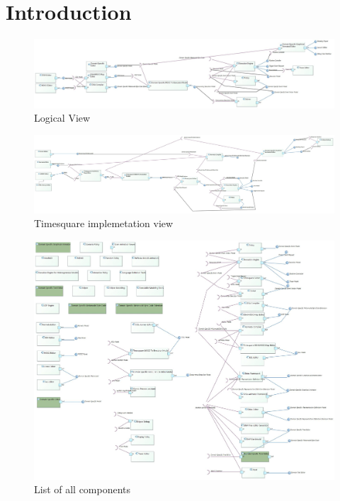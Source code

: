 \documentclass{gemoc} %
\begin{document}
\section{Introduction}
\begin{figure}[bt]
	\begin{center}
	\includegraphics*[trim=0.0cm 0.0cm 0cm 0.0cm, clip=true, angle=90, totalheight=0.9\textheight]{../images/Logical View.jpg}
	\caption{Logical View}
	\label{fig:LogicalView}
	\end{center}
\end{figure}
\begin{figure}[bt]
	\begin{center}
	\includegraphics*[trim=0.0cm 0.0cm 0cm 0.0cm, clip=true, angle=90, totalheight=0.9\textheight]{../images/TimesquareImplementation.jpg}
	\caption{Timesquare implemetation view}
	\label{fig:TimesquareImplementation}
	\end{center}
\end{figure}
\begin{figure}[bt]
	\begin{center}
	\includegraphics*[trim=0.0cm 0.0cm 0cm 0.0cm, clip=true, width=1.0\linewidth]{../images/All Components list.jpg}
	\caption{List of all components}
	\label{fig:AllComponentList}
	\end{center}
\end{figure}
\end{document}
